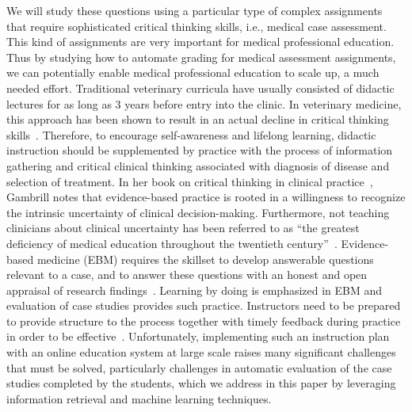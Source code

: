 We will study these questions using a particular type of complex
assignments that require sophisticated critical thinking skills, i.e.,
medical case assessment. This kind of assignments are very important for
medical professional education. Thus by studying how to automate grading
for medical assessment assignments, we can potentially enable medical
professional education to scale up, a much needed effort. Traditional
veterinary curricula have usually consisted of didactic lectures for as
long as 3 years before entry into the clinic. In veterinary medicine, this
approach has been shown to result in an actual decline in critical thinking
skills~\cite{Herron:1992}. Therefore, to encourage self-awareness and
lifelong learning, didactic instruction should be supplemented by practice
with the process of information gathering and critical clinical thinking
associated with diagnosis of disease and selection of treatment. In her
book on critical thinking in clinical practice~\cite{Gambrill:2005},
Gambrill notes that evidence-based practice is rooted in a willingness to
recognize the intrinsic uncertainty of clinical decision-making.
Furthermore, not teaching clinicians about clinical uncertainty has
been referred to as ``the greatest deficiency of medical education
throughout the twentieth century''~\cite{Djulbegovic:2004, Gambrill:2005}.
Evidence-based medicine (EBM) requires the skillset to develop answerable
questions relevant to a case, and to answer these questions with an honest
and open appraisal of research findings~\cite{Braddock:1999}.
Learning by doing is emphasized in EBM and evaluation of case
studies provides such practice. Instructors need to be prepared to provide
structure to the process together with timely feedback during practice in
order to be effective~\cite{Gambrill:2005}. Unfortunately, implementing
such an instruction plan with an online education system at large scale
raises many significant challenges that must be solved, particularly
challenges in automatic evaluation of the case studies completed by the
students, which we address in this paper by leveraging information
retrieval and machine learning techniques.

